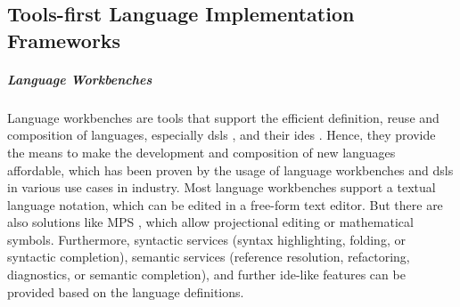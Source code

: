 


\subsection{Tools-first Language Implementation Frameworks}
    \subparagraph{Language Workbenches}
    Language workbenches are tools that support the efficient definition, reuse and composition of languages, especially \acp{dsl} \cite{Fowler2010DomainSpecificLanguages}, and their \acp{ide} \cite{erdweg2013state}. Hence, they provide the means to make the development and composition of new languages affordable, which has been proven by the usage of language workbenches and \acp{dsl} in various use cases in industry. Most language workbenches support a textual language notation, which can be edited in a free-form text editor. But there are also solutions like MPS \cite{voelter2012language}, which allow projectional editing or mathematical symbols. Furthermore, syntactic services (syntax highlighting, folding, or syntactic completion), semantic services (reference resolution, refactoring, diagnostics, or semantic completion), and further \ac{ide}-like features can be provided based on the language definitions.

